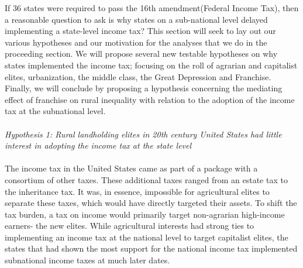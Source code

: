 \documentclass[letter, 12pt]{article}
\begin{document}
If 36 states were required to pass the 16th amendment(Federal Income Tax), then a reasonable question to ask is why states on a sub-national level delayed implementing a state-level income tax? This section will seek to lay out our various hypotheses and our motivation for the analyses that we do in the proceeding section. We will propose several new testable hypotheses on why states implemented the income tax; focusing on the roll of agrarian and capitalist elites, urbanization, the middle class, the Great Depression and Franchise. Finally, we will conclude by proposing a hypothesis concerning the mediating effect of franchise on rural inequality with relation to the adoption of the income tax at the subnational level. 
\\
\\
\emph{Hypothesis 1: Rural landholding elites in 20th century United States had little interest in adopting the income tax at the state level}
\\
\\
The income tax in the United States came as part of a package with a consortium of other taxes. These additional taxes ranged from an estate tax to the inheritance tax. It was, in essence, impossible for agricultural elites to separate these taxes, which would have directly targeted their assets. To shift the tax burden, a tax on income would primarily target non-agrarian high-income earners- the new elites. While agricultural interests had strong ties to implementing an income tax at the national level to target capitalist elites, the states that had shown the most support for the national income tax implemented subnational income taxes at much later dates. 
\end{document}
